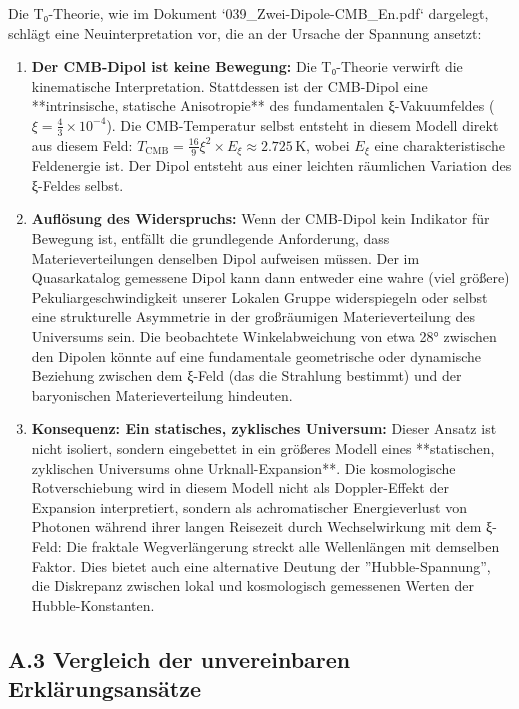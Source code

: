 Die T₀-Theorie, wie im Dokument `039\_Zwei-Dipole-CMB\_En.pdf` dargelegt, schlägt eine Neuinterpretation vor, die an der Ursache der Spannung ansetzt:

\begin{enumerate}
	\item \textbf{Der CMB-Dipol ist keine Bewegung:} Die T₀-Theorie verwirft die kinematische Interpretation. Stattdessen ist der CMB-Dipol eine **intrinsische, statische Anisotropie** des fundamentalen ξ-Vakuumfeldes ($ \xi = \frac{4}{3} \times 10^{-4} $). Die CMB-Temperatur selbst entsteht in diesem Modell direkt aus diesem Feld: $ T_{\text{CMB}} = \frac{16}{9} \xi^2 \times E_\xi \approx 2.725 \, \text{K} $, wobei $E_\xi$ eine charakteristische Feldenergie ist. Der Dipol entsteht aus einer leichten räumlichen Variation des ξ-Feldes selbst.
	
	\item \textbf{Auflösung des Widerspruchs:} Wenn der CMB-Dipol kein Indikator für Bewegung ist, entfällt die grundlegende Anforderung, dass Materieverteilungen denselben Dipol aufweisen müssen. Der im Quasarkatalog gemessene Dipol kann dann entweder eine wahre (viel größere) Pekuliargeschwindigkeit unserer Lokalen Gruppe widerspiegeln oder selbst eine strukturelle Asymmetrie in der großräumigen Materieverteilung des Universums sein. Die beobachtete Winkelabweichung von etwa 28° zwischen den Dipolen könnte auf eine fundamentale geometrische oder dynamische Beziehung zwischen dem ξ-Feld (das die Strahlung bestimmt) und der baryonischen Materieverteilung hindeuten.
	
	\item \textbf{Konsequenz: Ein statisches, zyklisches Universum:} Dieser Ansatz ist nicht isoliert, sondern eingebettet in ein größeres Modell eines **statischen, zyklischen Universums ohne Urknall-Expansion**. Die kosmologische Rotverschiebung wird in diesem Modell nicht als Doppler-Effekt der Expansion interpretiert, sondern als achromatischer Energieverlust von Photonen während ihrer langen Reisezeit durch Wechselwirkung mit dem ξ-Feld: Die fraktale Wegverlängerung streckt alle Wellenlängen mit demselben Faktor. Dies bietet auch eine alternative Deutung der ''Hubble-Spannung'', die Diskrepanz zwischen lokal und kosmologisch gemessenen Werten der Hubble-Konstanten.
\end{enumerate}

\subsection*{A.3 Vergleich der unvereinbaren Erklärungsansätze}

